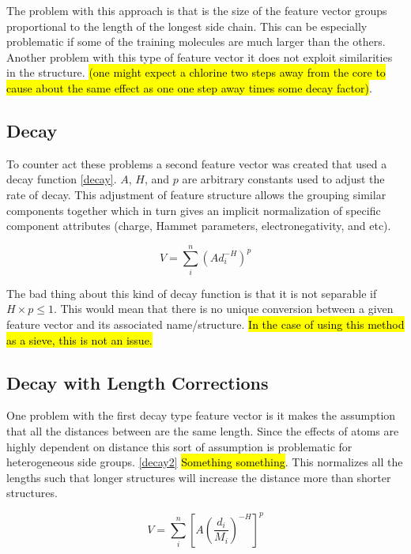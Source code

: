 \documentclass[10pt]{article}
\begin{document}
The problem with this approach is that is the size of the feature vector groups proportional to the length of the longest side chain. This can be especially problematic if some of the training molecules are much larger than the others. Another problem with this type of feature vector it does not exploit similarities in the structure. \hl{(one might expect a chlorine two steps away from the core to cause about the same effect as one one step away times some decay factor)}.


\subsection{Decay}
To counter act these problems a second feature vector was created that used a decay function \eqref{decay}. $A$, $H$, and $p$ are arbitrary constants used to adjust the rate of decay. This adjustment of feature structure allows the grouping similar components together which in turn gives an implicit normalization of specific component attributes (charge, Hammet parameters, electronegativity, and etc).

\begin{equation}\label{decay}
    V = \sum_i^n (A d_i^{-H})^{p}
\end{equation}

The bad thing about this kind of decay function is that it is not separable if $H \times p \le 1$. This would mean that there is no unique conversion between a given feature vector and its associated name/structure. \hl{In the case of using this method as a sieve, this is not an issue.}


\subsection{Decay with Length Corrections}

One problem with the first decay type feature vector is it makes the assumption that all the distances between are the same length. Since the effects of atoms are highly dependent on distance this sort of assumption is problematic for heterogeneous side groups. \eqref{decay2} \hl{Something something}. This normalizes all the lengths such that longer structures will increase the distance more than shorter structures.

\begin{equation}\label{decay2}
    V = \sum_i^n \left[A \left(\frac{d_i}{M_i}\right)^{-H} \right]^{p}
\end{equation}
\end{document}
